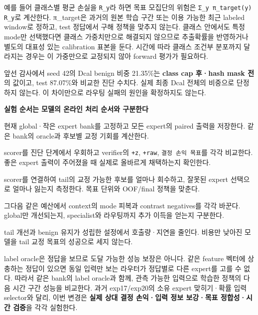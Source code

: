 예를 들어 클래스별 평균 손실을 \texttt{R\_\allowbreak{}\allowbreak{}y}라 하면 목표 모집단의 위험은 \texttt{Σ\_\allowbreak{}\allowbreak{}y π\_\allowbreak{}\allowbreak{}ta\allowbreak{}rget(y) \allowbreak{}R\_\allowbreak{}\allowbreak{}y}로 계산한다. π\_\allowbreak{}target은 과거의 원본 학습 구간 또는 이용 가능한 최근 labeled window로 정하고, test 정답에서 구해 정책을 맞추지 않는다. 클래스 안에서도 특정 mode만 선택했다면 클래스 가중치만으로 해결되지 않으므로 추출확률을 반영하거나 별도의 대표성 있는 calibration 표본을 둔다. 시간에 따라 클래스 조건부 분포까지 달라지는 경우는 이 가중만으로 교정되지 않아 forward 평가가 필요하다.

앞선 감사에서 seed 42의 Dcal benign 비중 21.35\%는 \textbf{class cap 후·hash mask 전}의 값이고, test 87.07\%와 비교한 진단 수치다. 실제 최종 Dcal 전체의 비중으로 단정하지 않는다. 이 차이만으로 라우팅 실패의 원인을 확정하지도 않는다.

\textbf{실험 순서는 모델의 온라인 처리 순서와 구분한다}

\par\noindent \textbullet\enspace 현재 global·작은 expert bank를 고정하고 모든 expert의 paired 출력을 저장한다. 같은 bank의 oracle과 후보별 교정 기회를 계산한다.


\par\noindent \textbullet\enspace scorer를 진단 단계에서 우회하고 verifier의 \texttt{+\allowbreak{}\allowbreak{}z}, \texttt{+\allowbreak{}\allowbreak{}raw}, \texttt{결정 손익 목표\allowbreak{}}를 각각 비교한다. 좋은 expert 출력이 주어졌을 때 실제로 올바르게 채택하는지 확인한다.


\par\noindent \textbullet\enspace scorer를 연결하여 tail의 교정 가능한 후보를 얼마나 회수하고, 잘못된 expert 선택으로 얼마나 잃는지 측정한다. 목표 단위와 OOF/\allowbreak{}final 정책을 맞춘다.


\par\noindent \textbullet\enspace 그다음 같은 예산에서 context의 mode 피복과 contrast negatives를 각각 바꾼다. global만 개선되는지, specialist와 라우팅까지 추가 이득을 얻는지 구분한다.


\par\noindent \textbullet\enspace tail 개선과 benign 유지가 성립한 설정에서 호출량·지연을 줄인다. 비용만 낮아진 모델을 tail 교정 목표의 성공으로 세지 않는다.


label oracle은 정답을 보므로 도달 가능한 성능 보장은 아니다. 같은 feature 벡터에 상충하는 정답이 있으면 동일 입력만 보는 라우터가 정답별로 다른 expert를 고를 수 없다. 따라서 같은 bank의 label oracle과 함께, 관측 가능한 입력으로 학습한 정책의 다음 시간 구간 성능을 비교한다. 과거 exp17/\allowbreak{}exp20의 소유 expert 맞히기·확률 입력 selector와 달리, 이번 변경은 \textbf{실제 상대 결정 손익·입력 정보 보강·목표 정합성·시간 검증}을 각각 실험한다.

